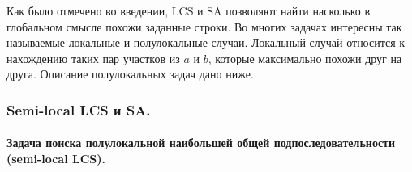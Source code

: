 Как было отмечено во введении, LCS  и SA позволяют найти насколько в глобальном смысле похожи заданные строки.
Во многих задачах интересны так называемые локальные и полулокальные случаи.
Локальный случай относится к нахождению таких пар участков из $a$ и $b$, которые максимально похожи друг на друга.
Описание полулокальных задач дано ниже.


\subsubsection{Semi-local LCS и SA.}

\paragraph*{Задача поиска полулокальной наибольшей общей подпоследовательности (semi-local LCS).}

